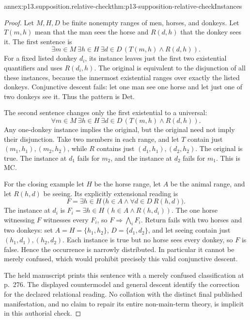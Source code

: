 \begin{annexitem}{annex:p13.supposition.relative-check}{thm:p13-supposition-relative-check}{Instances}
\begin{proof}
Let \(M,H,D\) be finite nonempty ranges of men, horses, and donkeys.
Let \(T(m,h)\) mean that the man sees the horse and \(R(d,h)\)
that the donkey sees it. The first sentence is
\[
 \exists m\in M\ \exists h\in H\ \exists d\in D\,
       (T(m,h)\land R(d,h)).
\]
For a fixed listed donkey \(d_i\), its instance leaves just the
first two existential quantifiers and uses \(R(d_i,h)\). The
original is equivalent to the disjunction of all these instances,
because the innermost existential ranges over exactly the listed
donkeys. Conjunctive descent fails: let one man see one horse and
let just one of two donkeys see it. Thus the pattern is Det.

The second sentence changes only the first existential to a universal:
\[
 \forall m\in M\ \exists h\in H\ \exists d\in D\,
       (T(m,h)\land R(d,h)).
\]
Any one-donkey instance implies the original, but the original need
not imply their disjunction. Take two members in each range, and let
\(T\) contain just \((m_1,h_1),(m_2,h_2)\), while \(R\)
contains just \((d_1,h_1),(d_2,h_2)\). The original is true.
The instance at \(d_1\) fails for \(m_2\), and the instance
at \(d_2\) fails for \(m_1\). This is MC.

For the closing example let \(H\) be the horse range, let \(A\)
be the animal range, and let \(R(h,d)\) be seeing. Its explicitly
extensional reading is
\[
 F=\exists h\in H\,
       \bigl(h\in A\land\forall d\in D\ R(h,d)\bigr).
\]
The instance at \(d_i\) is
\(F_i=\exists h\in H\,(h\in A\land R(h,d_i))\).
The one horse witnessing \(F\) witnesses every \(F_i\), so
\(F\Rightarrow\bigwedge_iF_i\). Return fails with two horses
and two donkeys: set \(A=H=\{h_1,h_2\}\),
\(D=\{d_1,d_2\}\), and let seeing contain just
\((h_1,d_1),(h_2,d_2)\). Each instance is true but no horse
sees every donkey, so \(F\) is false. Hence the occurrence is
narrowly distributed. In particular it cannot be merely confused,
which would prohibit precisely this valid conjunctive descent.

The held manuscript prints this sentence with a merely confused
classification at p.~276. The displayed countermodel and general
descent identify the correction for the declared relational reading.
No collation with the distinct final published manifestation, and no
claim to repair its entire non-main-term theory, is implicit in this
authorial check.
\end{proof}
\end{annexitem}
